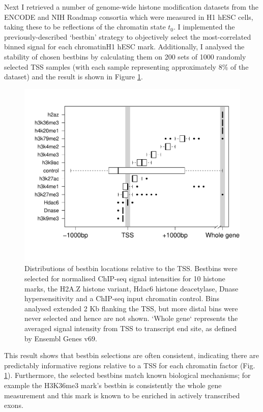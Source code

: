 \documentclass[a4paper,11pt,oneside]{book}
\begin{document}
Next I retrieved a number of genome-wide histone modification datasets
from the ENCODE and
NIH Roadmap consortia which were measured in H1 hESC cells, taking these to be
reflections of the chromatin state $t_0$. I implemented the
previously-described `bestbin' strategy\cite{Dong2012} to objectively
select the most-correlated binned signal for each chromatinH1 hESC
mark. Additionally, I analysed the stability of chosen bestbins by
calculating them on 200 sets of 1000 randomly selected TSS samples (with each sample
representing approximately $8\%$ of the dataset) and the result is
shown in Figure \ref{fig:bestbin}.

\begin{figure}
\begin{center} 
\includegraphics[width=.9\textwidth]{figs/bestbinSummary.pdf}
\captionsetup{width=\textwidth}
\caption{Distributions of bestbin locations relative to the
  TSS. Bestbins were selected for normalised ChIP-seq
  signal intensities for 10 histone marks, the
  H2A.Z histone variant, Hdac6 histone deacetylase, Dnase
  hypersensitivity and a ChIP-seq input chromatin control. Bins analysed
  extended 2 Kb flanking the TSS, but more distal bins were
  never selected and hence are not shown. `Whole gene` represents the
  averaged signal intensity from TSS to transcript end site, as
  defined by Ensembl Genes v69.
}\label{fig:bestbin}
\end{center}
\end{figure} 

This result shows that bestbin selections are often consistent, indicating there are predictably informative regions
relative to a TSS for each chromatin factor (Fig. \ref{fig:bestbin}). Furthermore, the selected
bestbins match known biological mechanisms; for example the H3K36me3
mark's bestbin is consistently the whole gene measurement and this
mark is known to be enriched in actively transcribed
exons.\cite{Tippmann2012, Kolasinska-Zwierz2009, Schaft2003} 
\end{document}
